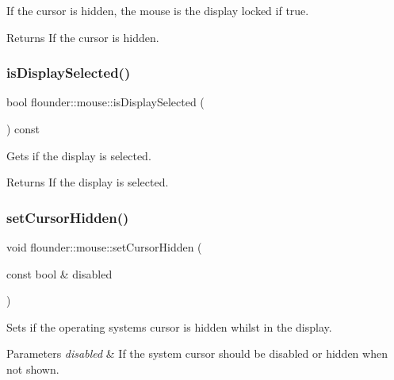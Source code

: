 If the cursor is hidden, the mouse is the display locked if true. 

\begin{DoxyReturn}{Returns}
If the cursor is hidden. 
\end{DoxyReturn}
\mbox{\label{classflounder_1_1mouse_ade2f260576e6fa3122664ef83422722a}} 
\subsubsection{\texorpdfstring{is\+Display\+Selected()}{isDisplaySelected()}}
{\footnotesize\ttfamily bool flounder\+::mouse\+::is\+Display\+Selected (\begin{DoxyParamCaption}{ }\end{DoxyParamCaption}) const\hspace{0.3cm}{\ttfamily [inline]}}



Gets if the display is selected. 

\begin{DoxyReturn}{Returns}
If the display is selected. 
\end{DoxyReturn}
\mbox{\label{classflounder_1_1mouse_aff9750c7d68e93aea4c2d3c447677a9e}} 
\subsubsection{\texorpdfstring{set\+Cursor\+Hidden()}{setCursorHidden()}}
{\footnotesize\ttfamily void flounder\+::mouse\+::set\+Cursor\+Hidden (\begin{DoxyParamCaption}\item[{const bool \&}]{disabled }\end{DoxyParamCaption})}



Sets if the operating systems cursor is hidden whilst in the display. 


\begin{DoxyParams}{Parameters}
{\em disabled} & If the system cursor should be disabled or hidden when not shown. \\
\hline
\end{DoxyParams}
\mbox{\label{classflounder_1_1mouse_ab6b1c2f498e6fdef0a2ff827ef93928a}} 
